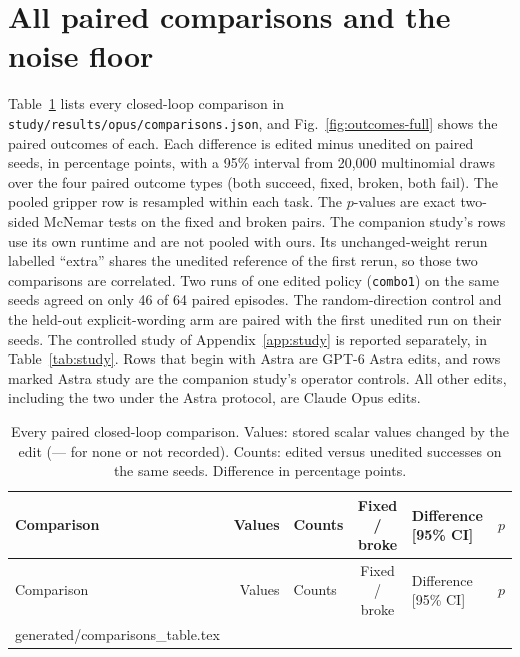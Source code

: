 \documentclass{article}
\makeatletter
\newcommand{\tabinput}[1]{\@@input #1 }
\makeatother
\begin{document}
\section{All paired comparisons and the noise floor}
\label{app:comparisons}
Table~\ref{tab:all} lists every closed-loop comparison in \texttt{study/results/opus/comparisons.json}, and Fig.~\ref{fig:outcomes-full} shows the paired outcomes of each. Each difference is edited minus unedited on paired seeds, in percentage points, with a 95\% interval from 20,000 multinomial draws over the four paired outcome types (both succeed, fixed, broken, both fail). The pooled gripper row is resampled within each task. The $p$-values are exact two-sided McNemar tests on the fixed and broken pairs. The companion study's rows use its own runtime and are not pooled with ours. Its unchanged-weight rerun labelled ``extra'' shares the unedited reference of the first rerun, so those two comparisons are correlated. Two runs of one edited policy (\texttt{combo1}) on the same seeds agreed on only 46 of 64 paired episodes. The random-direction control and the held-out explicit-wording arm are paired with the first unedited run on their seeds. The controlled study of Appendix~\ref{app:study} is reported separately, in Table~\ref{tab:study}. Rows that begin with Astra are GPT-6 Astra edits, and rows marked Astra study are the companion study's operator controls. All other edits, including the two under the Astra protocol, are Claude Opus edits.

{\fontsize{8}{9.6}\selectfont
\setlength{\tabcolsep}{2.6pt}
\setlength{\LTcapwidth}{\linewidth}
\begin{longtable}{@{}>{\raggedright\arraybackslash}p{.27\linewidth}rlcll@{}}
\caption{Every paired closed-loop comparison. Values: stored scalar values changed by the edit (--- for none or not recorded). Counts: edited versus unedited successes on the same seeds. Difference in percentage points.}
\label{tab:all}\\
\toprule
Comparison & Values & Counts & Fixed / broke & Difference [95\% CI] & $p$\\
\midrule
\endfirsthead
\toprule
Comparison & Values & Counts & Fixed / broke & Difference [95\% CI] & $p$\\
\midrule
\endhead
\tabinput{generated/comparisons_table.tex}
\bottomrule
\end{longtable}
}
\end{document}
